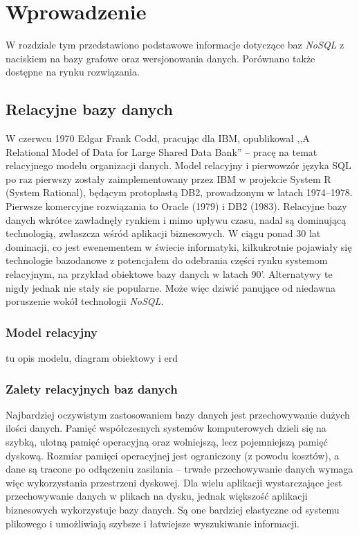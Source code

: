 \chapter{Wprowadzenie}
\label{cha:wprowadzenie}

W rozdziale tym przedstawiono podstawowe informacje dotyczące baz \emph{NoSQL} z naciskiem na bazy grafowe oraz wersjonowania danych. Porównano także dostępne na rynku rozwiązania.




\section{Relacyjne bazy danych}
\label{sec:relacyjneBazyDanych}

W czerwcu 1970 Edgar Frank Codd, pracując dla IBM, opublikował ,,A Relational Model of Data for Large Shared Data Bank'' -- pracę na temat relacyjnego modelu organizacji danych. Model relacyjny i pierwowzór języka SQL po raz pierwszy zostały zaimplementowany przez IBM w projekcie System R (System Rational), będącym protoplastą DB2, prowadzonym w latach 1974–1978. Pierwsze komercyjne rozwiązania to Oracle (1979) i DB2 (1983). Relacyjne bazy danych wkrótce zawładnęły rynkiem i mimo upływu czasu, nadal są dominującą technologią, zwłaszcza wśród aplikacji biznesowych. W ciągu ponad 30 lat dominacji, co jest ewenementem w świecie informatyki, kilkukrotnie pojawiały się technologie bazodanowe z potencjałem do odebrania części rynku systemom relacyjnym, na przykład obiektowe bazy danych w latach 90'. Alternatywy te nigdy jednak nie stały sie popularne. Może więc dziwić panujące od niedawna poruszenie wokół technologii \emph{NoSQL}.

\subsection{Model relacyjny}
\label{sec:modelRelacyjny}

tu opis modelu, diagram obiektowy i erd

\subsection{Zalety relacyjnych baz danych}
\label{sec:zaletyRelacyjnychBazDanych}

Najbardziej oczywistym zastosowaniem bazy danych jest przechowywanie dużych ilości danych. Pamięć współczesnych systemów komputerowych dzieli się na szybką, ulotną pamięć operacyjną oraz wolniejszą, lecz pojemniejszą pamięć dyskową. Rozmiar pamięci operacyjnej jest ograniczony (z powodu kosztów), a dane są tracone po odłączeniu zasilania -- trwałe przechowywanie danych wymaga więc wykorzystania przestrzeni dyskowej.
Dla wielu aplikacji wystarczające jest przechowywanie danych w plikach na dysku, jednak większość aplikacji biznesowych wykorzystuje bazy danych. Są one bardziej elastyczne od systemu plikowego i umożliwiają szybsze i łatwiejsze wyszukiwanie informacji.

